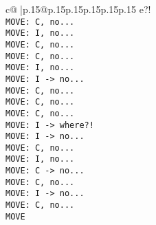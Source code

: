 \documentclass{article}
\begin{document}
{\begin{supertabular}{c@{$\;$}|p{.15\linewidth}@{}p{.15\linewidth}p{.15\linewidth}p{.15\linewidth}p{.15\linewidth}p{.15\linewidth}}
{{{e?!\\ \tt  MOVE: C, no...\\ \tt  MOVE: I, no...\\ \tt  MOVE: C, no...\\ \tt  MOVE: C, no...\\ \tt  MOVE: I, no...\\ \tt  MOVE: I -> no...\\ \tt  MOVE: C, no...\\ \tt  MOVE: C, no...\\ \tt  MOVE: C, no...\\ \tt  MOVE: I -> where?!\\ \tt  MOVE: I -> no...\\ \tt  MOVE: C, no...\\ \tt  MOVE: I, no...\\ \tt  MOVE: C -> no...\\ \tt  MOVE: C, no...\\ \tt  MOVE: I -> no...\\ \tt  MOVE: C, no...\\ \tt  MOVE}}}
\end{supertabular}}
\end{document}
